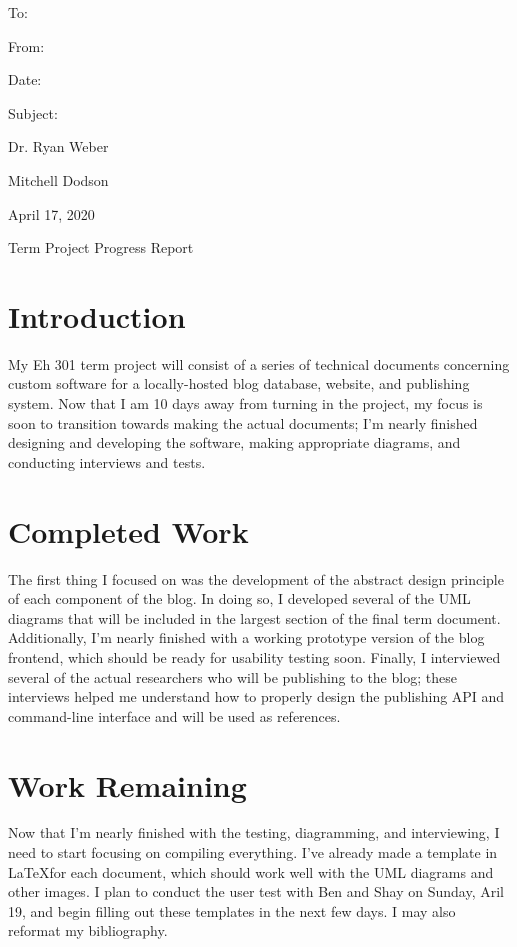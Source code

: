 \documentclass[12pt]{article}
\begin{document}
\begin{minipage}[h]{.1\textwidth}
    To:

    From:

    Date:

    Subject:
\end{minipage}
\begin{minipage}[h]{.8\textwidth}


    Dr. Ryan Weber

    Mitchell Dodson

    April 17, 2020

    Term Project Progress Report
\end{minipage}

\section{Introduction}

My Eh 301 term project will consist of a series of technical documents concerning custom software for a locally-hosted blog database, website, and publishing system. Now that I am 10 days away from turning in the project, my focus is soon to transition towards making the actual documents; I'm nearly finished designing and developing the software, making appropriate diagrams, and conducting interviews and tests.

\section{Completed Work}

The first thing I focused on was the development of the abstract design principle of each component of the blog. In doing so, I developed several of the UML diagrams that will be included in the largest section of the final term document. Additionally, I'm nearly finished with a working prototype version of the blog frontend, which should be ready for usability testing soon. Finally, I interviewed several of the actual researchers who will be publishing to the blog; these interviews helped me understand how to properly design the publishing API and command-line interface and will be used as references.

\section{Work Remaining}

Now that I'm nearly finished with the testing, diagramming, and interviewing, I need to start focusing on compiling everything. I've already made a template in \LaTeX for each document, which should work well with the UML diagrams and other images. I plan to conduct the user test with Ben and Shay on Sunday, Aril 19, and begin filling out these templates in the next few days. I may also reformat my bibliography.
\end{document}

